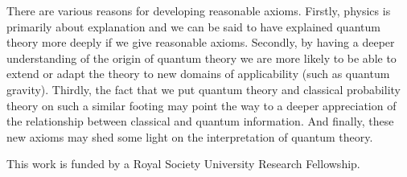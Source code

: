 \documentclass[12pt]{article}
\begin{document}
There are various reasons for developing reasonable axioms.  Firstly,
physics is primarily about explanation and we can be said to have
explained quantum theory more deeply if we give reasonable axioms.
Secondly, by having a deeper understanding of the origin of quantum
theory we are more likely to be able to extend or adapt the theory to
new domains of applicability (such as quantum gravity).  Thirdly, the
fact that we put quantum theory and classical probability theory on such
a similar footing may point the way to a deeper appreciation of
the relationship between classical and quantum information.
And finally, these new axioms may shed some light on the interpretation
of quantum theory.

\vspace{6mm}


\vspace{6mm}

This work is funded by a Royal Society University Research Fellowship.
\end{document}
